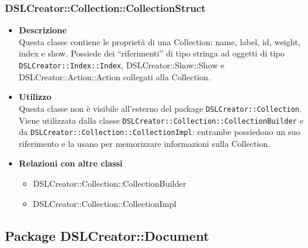  \subsubsection{DSLCreator::Collection::CollectionStruct}
                    \begin{itemize}
                        \item \textbf{Descrizione} \hfill \\
                            Questa classe contiene le proprietà di una Collection: name, label, id, weight, index e show. Possiede dei ``riferimenti'' di tipo stringa ad oggetti di tipo \texttt{DSLCreator::Index::Index}, {DSLCreator::Show::Show} e {DSLCreator::Action::Action} collegati alla Collection.
                        \item \textbf{Utilizzo} \hfill \\
                            Questa classe non è visibile all'esterno del package \texttt{DSLCreator::Collection}. Viene utilizzata dalla classe \texttt{DSLCreator::Collection::CollectionBuilder} e da \texttt{DSLCreator::Collection::CollectionImpl}: entrambe possiedono un suo riferimento e la usano per memorizzare informazioni sulla Collection. 
                        \item \textbf{Relazioni con altre classi}
                            \begin{itemize}
                              \item DSLCreator::Collection::CollectionBuilder
                              \item DSLCreator::Collection::CollectionImpl
                            \end{itemize}
                    \end{itemize}

\subsection{Package DSLCreator::Document}

